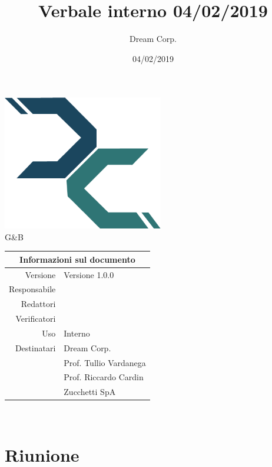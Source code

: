 \documentclass[12pt]{article}
\title{\fontsize{40}{40}\selectfont Verbale interno 04/02/2019}
\author{Dream Corp.}
\date{04/02/2019}
\newcommand{\red}{\mic}
\newcommand{\verp}{\mat}
\newcommand{\res}{\mic}
\newcommand{\version}{Versione 1.0.0}
\newcommand{\use}{Interno}
\begin{document}
\maketitle
\begin{center}
	\hspace{5em}
	\includegraphics[width =70mm]{logo.png}\newline 
	\\G\&B
	\begin{table}[!htpb]
		\centering
		\begin{tabular}{r|l}
			\multicolumn{2}{c}{Informazioni sul documento}\\
			\hline
			Versione & \version \\
			Responsabile & \res\\
			Redattori & \red \\
			Verificatori & \verp\\
			Uso & \use\\
			
			Destinatari & Dream Corp. \\
			& Prof. Tullio Vardanega\\
			& Prof. Riccardo Cardin\\
			& Zucchetti SpA\\
		\end{tabular}
	\end{table}
\end{center}
\newpage

~\newline


\section{Riunione}
\end{document}
